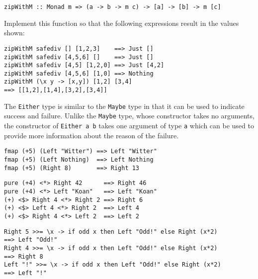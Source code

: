 \begin{verbatim}
zipWithM :: Monad m => (a -> b -> m c) -> [a] -> [b] -> m [c]
\end{verbatim}
Implement this function so that the following expressions result in the values shown:
\begin{verbatim}
zipWithM safediv [] [1,2,3]    ==> Just []
zipWithM safediv [4,5,6] []    ==> Just []
zipWithM safediv [4,5] [1,2,0] ==> Just [4,2]
zipWithM safediv [4,5,6] [1,0] ==> Nothing
zipWithM (\x y -> [x,y]) [1,2] [3,4] 
==> [[1,2],[1,4],[3,2],[3,4]]
\end{verbatim}


\taskLine

The \texttt{\small Either} type is similar to the \texttt{\small Maybe} type in that it can be used to indicate success and failure. Unlike the \texttt{\small Maybe} type, whose  constructor takes no arguments, the  constructor of \texttt{\small Either a b} takes one argument of type \texttt{\small a} which can be used to provide more information about the reason of the failure.

\begin{verbatim}
fmap (+5) (Left "Witter") ==> Left "Witter" 
fmap (+5) (Left Nothing)  ==> Left Nothing
fmap (+5) (Right 8)       ==> Right 13
\end{verbatim}

\begin{verbatim}
pure (+4) <*> Right 42      ==> Right 46 
pure (+4) <*> Left "Koan"   ==> Left "Koan"
(+) <$> Right 4 <*> Right 2 ==> Right 6
(+) <$> Left 4 <*> Right 2  ==> Left 4
(+) <$> Right 4 <*> Left 2  ==> Left 2
\end{verbatim}

\begin{verbatim}
Right 5 >>= \x -> if odd x then Left "Odd!" else Right (x*2) 
==> Left "Odd!"
Right 4 >>= \x -> if odd x then Left "Odd!" else Right (x*2) 
==> Right 8
Left "!" >>= \x -> if odd x then Left "Odd!" else Right (x*2)
==> Left "!"
\end{verbatim}

